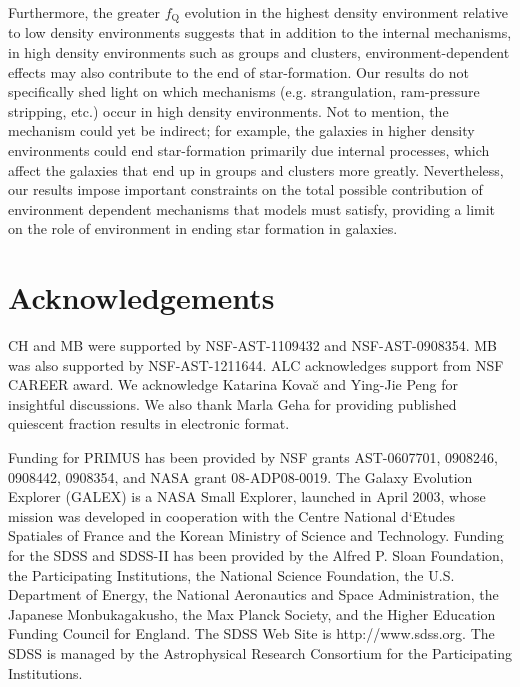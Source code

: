 Furthermore, the greater $f_{\mathrm{Q}}$ evolution in the highest density
environment relative to low density environments suggests that in
addition to the internal mechanisms, in high density environments such
as groups and clusters, environment-dependent effects may also
contribute to the end of star-formation. Our results do not
specifically shed light on which mechanisms (e.g. strangulation,
ram-pressure stripping, etc.) occur in high density environments. Not to 
mention, the mechanism could yet be indirect; for example, the
galaxies in higher density environments could end star-formation
primarily due internal processes, which affect the galaxies that end up
in groups and clusters more greatly.  Nevertheless, our results impose
important constraints on the total possible contribution of
environment dependent mechanisms that models must satisfy, providing a
limit on the role of environment in ending star formation in
galaxies. 

\section*{Acknowledgements}
CH and MB were supported by NSF-AST-1109432 and NSF-AST-0908354. MB was also supported by NSF-AST-1211644. ALC acknowledges support from NSF CAREER award. We acknowledge Katarina Kova\u{c} and Ying-Jie Peng for  insightful discussions. We also thank Marla Geha for providing published quiescent fraction results in electronic format.

Funding for PRIMUS has been provided by NSF grants AST-0607701, 0908246, 0908442, 0908354, and NASA grant 08-ADP08-0019. The Galaxy Evolution Explorer (GALEX) is a NASA Small Explorer, launched in April 2003, whose mission was developed in cooperation with the Centre National d`Etudes Spatiales of France and the Korean Ministry of Science and Technology. Funding for the SDSS and SDSS-II has been provided by the Alfred P. Sloan Foundation, the Participating Institutions, the National Science Foundation, the U.S. Department of Energy, the National Aeronautics and Space Administration, the Japanese Monbukagakusho, the Max Planck Society, and the Higher Education Funding Council for England. The SDSS Web Site is http://www.sdss.org. The SDSS is managed by the Astrophysical Research Consortium for the Participating Institutions. 
